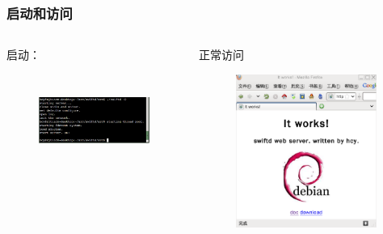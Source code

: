 \documentclass[10pt,dvipdfm]{beamer}
\begin{document}
\begin{frame}
	\frametitle{启动和访问}
	\begin{columns}
		\begin{column}{0.4\textwidth}
			启动：
			\begin{figure}[htbp]
			\centering
			\includegraphics[height=3cm, width=4.5cm]{pics/startup.eps}
			\end{figure}
		\end{column}
		
		\begin{column}{0.5\textwidth}
			正常访问
			\begin{figure}[htbp]
			\centering
			\includegraphics[height=5cm, width=6cm]{pics/works.eps}
			\end{figure}

		\end{column}
	\end{columns}
\end{frame}
\end{document}
